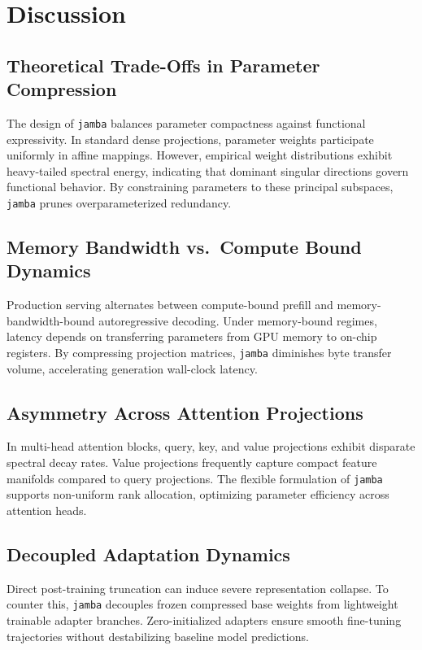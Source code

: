 \section{Discussion}

\subsection{Theoretical Trade-Offs in Parameter Compression}
The design of \texttt{jamba} balances parameter compactness against functional expressivity. In standard dense projections, parameter weights participate uniformly in affine mappings. However, empirical weight distributions exhibit heavy-tailed spectral energy, indicating that dominant singular directions govern functional behavior. By constraining parameters to these principal subspaces, \texttt{jamba} prunes overparameterized redundancy.

\subsection{Memory Bandwidth vs.\ Compute Bound Dynamics}
Production serving alternates between compute-bound prefill and memory-bandwidth-bound autoregressive decoding. Under memory-bound regimes, latency depends on transferring parameters from GPU memory to on-chip registers. By compressing projection matrices, \texttt{jamba} diminishes byte transfer volume, accelerating generation wall-clock latency.

\subsection{Asymmetry Across Attention Projections}
In multi-head attention blocks, query, key, and value projections exhibit disparate spectral decay rates. Value projections frequently capture compact feature manifolds compared to query projections. The flexible formulation of \texttt{jamba} supports non-uniform rank allocation, optimizing parameter efficiency across attention heads.

\subsection{Decoupled Adaptation Dynamics}
Direct post-training truncation can induce severe representation collapse. To counter this, \texttt{jamba} decouples frozen compressed base weights from lightweight trainable adapter branches. Zero-initialized adapters ensure smooth fine-tuning trajectories without destabilizing baseline model predictions.


